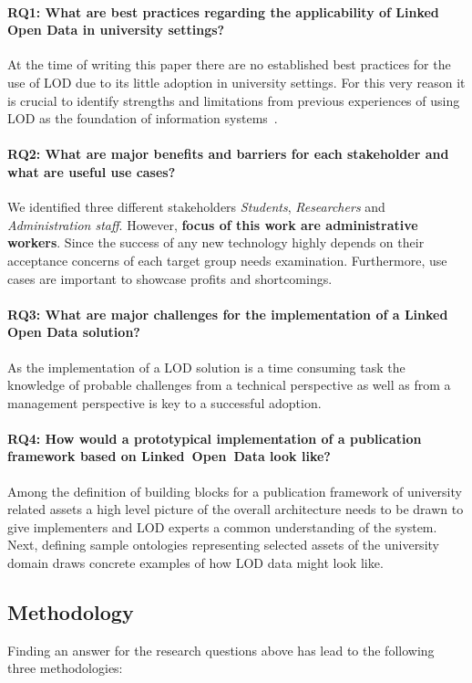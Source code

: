\documentclass{article}
\begin{document}
\paragraph{RQ1: What are best practices regarding the applicability of Linked Open Data in university settings?}
At the time of writing this paper there are no established best practices for the use of LOD due to its little adoption in university settings. For this very reason it is crucial to identify strengths and limitations from previous experiences of using LOD as the foundation of information systems~\cite{url:linked-universities-members}. 
\paragraph{RQ2: What are major benefits and barriers for each stakeholder and what are useful use cases?}
We identified three different stakeholders \textit{Students}, \textit{Researchers} and \textit{Administration staff}.
However, \textbf{focus of this work are administrative workers}.
Since the success of any new technology highly depends on their acceptance concerns of each target group needs examination. Furthermore, use cases are important to showcase profits and shortcomings. 
\paragraph{RQ3: What are major challenges for the implementation of a Linked Open Data solution?}
As the implementation of a LOD solution is a time consuming task the knowledge of probable challenges from a technical perspective as well as from a management perspective is key to a successful adoption. 
\paragraph{RQ4: How would a prototypical implementation of a publication framework based on Linked~Open~Data look like?}
Among the definition of building blocks for a publication framework of university related assets a high level picture of the overall architecture needs to be drawn to give implementers and LOD experts a common understanding of the system. Next, defining sample ontologies representing selected assets of the university domain draws concrete examples of how LOD data might look like. 

\subsection{Methodology}
Finding an answer for the research questions above has lead to the following three methodologies:
\end{document}
